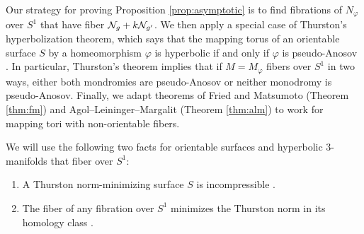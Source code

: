 Our strategy for proving Proposition \ref{prop:asymptotic} is to find fibrations of $N_{\varphi}$ over $S^1$ that have fiber $\mathcal{N}_g+k\mathcal{N}_{g'}$.  We then apply a special case of Thurston's hyperbolization theorem, which says that the mapping torus of an orientable surface $S$ by a homeomorphism $\varphi$ is hyperbolic if and only if $\varphi$ is pseudo-Anosov \cite[Theorem 0.1]{thurston_hyp}.  In particular, Thurston's theorem implies that if $M=M_\varphi$ fibers over $S^1$ in two ways, either both mondromies are pseudo-Anosov or neither monodromy is pseudo-Anosov.  Finally, we adapt theorems of Fried and Matsumoto (Theorem \ref{thm:fm}) and Agol--Leininger--Margalit (Theorem \ref{thm:alm}) to work for mapping tori with non-orientable fibers.


\medskip
We will use the following two facts for orientable surfaces and hyperbolic 3-manifolds that fiber over $S^1$:
\begin{enumerate}
 \item A Thurston norm-minimizing surface $S$ is incompressible \cite[Lemma 5.7]{calegari2007foliations}.
\item  The fiber of any fibration over $S^1$ minimizes the Thurston norm in its homology class \cite[Corollary 2]{thurston1986norm}.
\end{enumerate}





